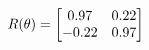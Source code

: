 \documentclass[preview]{standalone}
\begin{document}
\begin{align*}
\special{dvisvgm:raw <g id='unique000'>}R(\theta) = \begin{bmatrix}0.97 & 0.22\\-0.22 & 0.97\end{bmatrix}\special{dvisvgm:raw </g>}
\end{align*}
\end{document}
